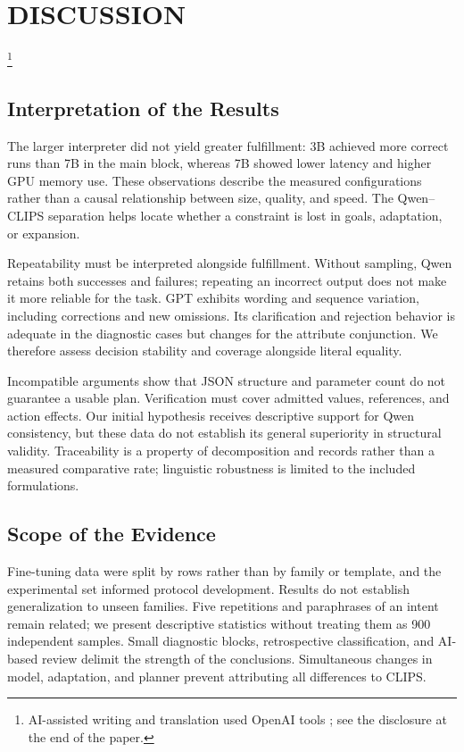 \documentclass[a4paper,twoside]{article}
\begin{document}
\section{DISCUSSION}\footnote{AI-assisted writing and translation used OpenAI tools \cite{openai_assistance}; see the disclosure at the end of the paper.}
\subsection{Interpretation of the Results}
The larger interpreter did not yield greater fulfillment: 3B achieved more correct runs than 7B in the main block, whereas 7B showed lower latency and higher GPU memory use. These observations describe the measured configurations rather than a causal relationship between size, quality, and speed. The Qwen--CLIPS separation helps locate whether a constraint is lost in goals, adaptation, or expansion.

Repeatability must be interpreted alongside fulfillment. Without sampling, Qwen retains both successes and failures; repeating an incorrect output does not make it more reliable for the task. GPT exhibits wording and sequence variation, including corrections and new omissions. Its clarification and rejection behavior is adequate in the diagnostic cases but changes for the attribute conjunction. We therefore assess decision stability and coverage alongside literal equality.

Incompatible arguments show that JSON structure and parameter count do not guarantee a usable plan. Verification must cover admitted values, references, and action effects. Our initial hypothesis receives descriptive support for Qwen consistency, but these data do not establish its general superiority in structural validity. Traceability is a property of decomposition and records rather than a measured comparative rate; linguistic robustness is limited to the included formulations.

\subsection{Scope of the Evidence}
Fine-tuning data were split by rows rather than by family or template, and the experimental set informed protocol development. Results do not establish generalization to unseen families. Five repetitions and paraphrases of an intent remain related; we present descriptive statistics without treating them as 900 independent samples. Small diagnostic blocks, retrospective classification, and AI-based review delimit the strength of the conclusions. Simultaneous changes in model, adaptation, and planner prevent attributing all differences to CLIPS.
\end{document}
